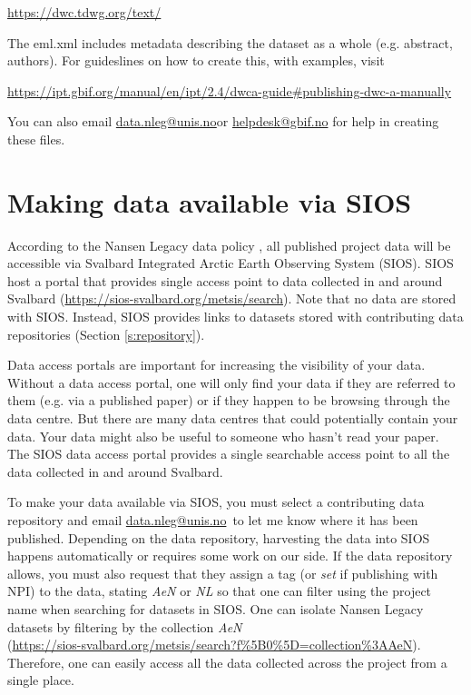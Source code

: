 \documentclass[a4paper,english, 11pt]{article}
\makeatletter
\newcommand{\emailme}{\href{mailto:data.nleg@unis.no}{data.nleg@unis.no}}
\makeatother
\begin{document}
\url{https://dwc.tdwg.org/text/}

The eml.xml includes metadata describing the dataset as a whole (e.g. abstract, authors). For guideslines on how to create this, with examples, visit

\url{https://ipt.gbif.org/manual/en/ipt/2.4/dwca-guide#publishing-dwc-a-manually}

You can also email \emailme or \href{mailto:helpdesk@gbif.no}{helpdesk@gbif.no} for help in creating these files.

\newpage
\section{Making data available via SIOS}
\label{s:SIOS}

According to the Nansen Legacy data policy \citep{aendatapolicy2021}, all published project data will be accessible via Svalbard Integrated Arctic Earth Observing System (SIOS). SIOS host a portal that provides single access point to data collected in and around Svalbard (\url{https://sios-svalbard.org/metsis/search}).
Note that no data are stored with SIOS. Instead, SIOS provides links to datasets stored with contributing data repositories (Section \ref{s:repository}). 

Data access portals are important for increasing the visibility of your data. Without a data access portal, one will only find your data if they are referred to them (e.g. via a published paper) or if they happen to be browsing through the data centre. But there are many data centres that could potentially contain your data. Your data might also be useful to someone who hasn't read your paper. The SIOS data access portal provides a single searchable access point to all the data collected in and around Svalbard.

To make your data available via SIOS, you must select a contributing data repository and email \emailme \ to let me know where it has been published. Depending on the data repository, harvesting the data into SIOS happens automatically or requires some work on our side. If the data repository allows, you must also request that they assign a tag (or \textit{set} if publishing with NPI) to the data, stating \textit{AeN} or \textit{NL} so that one can filter using the project name when searching for datasets in SIOS. One can isolate Nansen Legacy datasets by filtering by the collection \textit{AeN} \\ 
(\url{https://sios-svalbard.org/metsis/search?f%5B0%5D=collection%3AAeN}). 
Therefore, one can easily access all the data collected across the project from a single place.  
\end{document}
